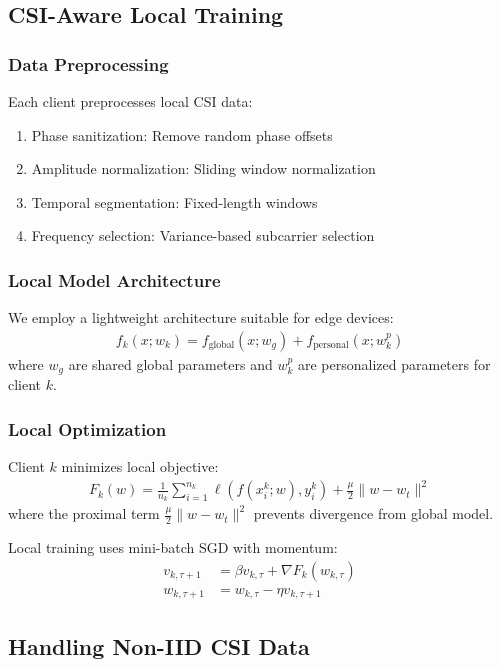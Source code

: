 \documentclass[journal]{IEEEtran}
\begin{document}
\subsection{CSI-Aware Local Training}

\subsubsection{Data Preprocessing}
Each client preprocesses local CSI data:
\begin{enumerate}
\item Phase sanitization: Remove random phase offsets
\item Amplitude normalization: Sliding window normalization
\item Temporal segmentation: Fixed-length windows
\item Frequency selection: Variance-based subcarrier selection
\end{enumerate}

\subsubsection{Local Model Architecture}
We employ a lightweight architecture suitable for edge devices:
\begin{align}
f_k(x; w_k) = f_{\text{global}}(x; w_g) + f_{\text{personal}}(x; w_k^p)
\end{align}
where $w_g$ are shared global parameters and $w_k^p$ are personalized parameters for client $k$.

\subsubsection{Local Optimization}
Client $k$ minimizes local objective:
\begin{align}
F_k(w) = \frac{1}{n_k}\sum_{i=1}^{n_k} \ell(f(x_i^k; w), y_i^k) + \frac{\mu}{2}\|w - w_t\|^2
\end{align}
where the proximal term $\frac{\mu}{2}\|w - w_t\|^2$ prevents divergence from global model.

Local training uses mini-batch SGD with momentum:
\begin{align}
v_{k,\tau+1} &= \beta v_{k,\tau} + \nabla F_k(w_{k,\tau}) \\
w_{k,\tau+1} &= w_{k,\tau} - \eta v_{k,\tau+1}
\end{align}

\subsection{Handling Non-IID CSI Data}
\end{document}
